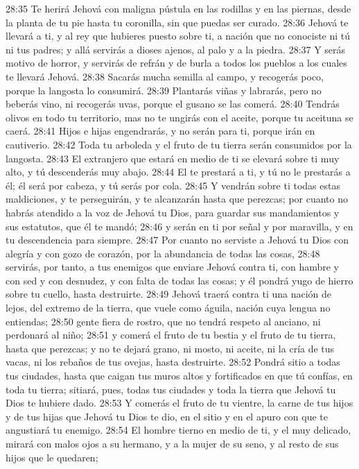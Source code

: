 28:35 Te herirá Jehová con maligna pústula en las rodillas y en las piernas, desde la planta de tu pie hasta tu coronilla, sin que puedas ser curado.  
28:36 Jehová te llevará a ti, y al rey que hubieres puesto sobre ti, a nación que no conociste ni tú ni tus padres; y allá servirás a dioses ajenos, al palo y a la piedra.  
28:37 Y serás motivo de horror, y servirás de refrán y de burla a todos los pueblos a los cuales te llevará Jehová.  
28:38 Sacarás mucha semilla al campo, y recogerás poco, porque la langosta lo consumirá.  
28:39 Plantarás viñas y labrarás, pero no beberás vino, ni recogerás uvas, porque el gusano se las comerá.  
28:40 Tendrás olivos en todo tu territorio, mas no te ungirás con el aceite, porque tu aceituna se caerá.  
28:41 Hijos e hijas engendrarás, y no serán para ti, porque irán en cautiverio.  
28:42 Toda tu arboleda y el fruto de tu tierra serán consumidos por la langosta.  
28:43 El extranjero que estará en medio de ti se elevará sobre ti muy alto, y tú descenderás muy abajo.  
28:44 El te prestará a ti, y tú no le prestarás a él; él será por cabeza, y tú serás por cola.  
28:45 Y vendrán sobre ti todas estas maldiciones, y te perseguirán, y te alcanzarán hasta que perezcas; por cuanto no habrás atendido a la voz de Jehová tu Dios, para guardar sus mandamientos y sus estatutos, que él te mandó;  
28:46 y serán en ti por señal y por maravilla, y en tu descendencia para siempre.  
28:47 Por cuanto no serviste a Jehová tu Dios con alegría y con gozo de corazón, por la abundancia de todas las cosas,  
28:48 servirás, por tanto, a tus enemigos que enviare Jehová contra ti, con hambre y con sed y con desnudez, y con falta de todas las cosas; y él pondrá yugo de hierro sobre tu cuello, hasta destruirte.  
28:49 Jehová traerá contra ti una nación de lejos, del extremo de la tierra, que vuele como águila, nación cuya lengua no entiendas;  
28:50 gente fiera de rostro, que no tendrá respeto al anciano, ni perdonará al niño;  
28:51 y comerá el fruto de tu bestia y el fruto de tu tierra, hasta que perezcas; y no te dejará grano, ni mosto, ni aceite, ni la cría de tus vacas, ni los rebaños de tus ovejas, hasta destruirte.  
28:52 Pondrá sitio a todas tus ciudades, hasta que caigan tus muros altos y fortificados en que tú confías, en toda tu tierra; sitiará, pues, todas tus ciudades y toda la tierra que Jehová tu Dios te hubiere dado.  
28:53 Y comerás el fruto de tu vientre, la carne de tus hijos y de tus hijas que Jehová tu Dios te dio, en el sitio y en el apuro con que te angustiará tu enemigo.  
28:54 El hombre tierno en medio de ti, y el muy delicado, mirará con malos ojos a su hermano, y a la mujer de su seno, y al resto de sus hijos que le quedaren;  
